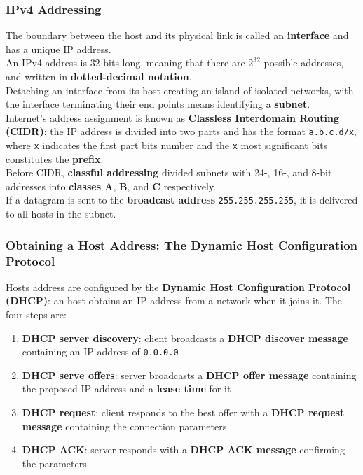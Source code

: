 \documentclass{article}
\begin{document}
\subsubsection{IPv4 Addressing}
The boundary between the host and its physical link is called an \textbf{interface} and has a unique IP address. \\ An IPv4 address is $32$ bits long, meaning that there are $2^{32}$ possible addresses, and written in \textbf{dotted-decimal notation}. \\ Detaching an interface from its host creating an island of isolated networks, with the interface terminating their end points means identifying a \textbf{subnet}. \\ Internet's address assignment is known as \textbf{Classless Interdomain Routing (CIDR)}: the IP address is divided into two parts and has the format \verb|a.b.c.d/x|, where \verb|x| indicates the first part bits number and the \verb|x| most significant bits constitutes the \textbf{prefix}. \\ Before CIDR, \textbf{classful addressing} divided subnets with 24-, 16-, and 8-bit addresses into \textbf{classes A}, \textbf{B}, and \textbf{C} respectively. \\ If a datagram is sent to the \textbf{broadcast address} \verb|255.255.255.255|, it is delivered to all hosts in the subnet.
\subsubsection*{Obtaining a Host Address: The Dynamic Host Configuration Protocol}
Hosts address are configured by the \textbf{Dynamic Host Configuration Protocol (DHCP)}: an host obtains an IP address from a network when it joins it. The four steps are:
\begin{enumerate}
    \item \textbf{DHCP server discovery}: client broadcasts a \textbf{DHCP discover message} containing an IP address of \verb|0.0.0.0|
    \item \textbf{DHCP serve offers}: server broadcasts a \textbf{DHCP offer message} containing the proposed IP address and a \textbf{lease time} for it
    \item \textbf{DHCP request}: client responds to the best offer with a \textbf{DHCP request message} containing the connection parameters
    \item \textbf{DHCP ACK}: server responds with a \textbf{DHCP ACK message} confirming the parameters
\end{enumerate}
\end{document}
